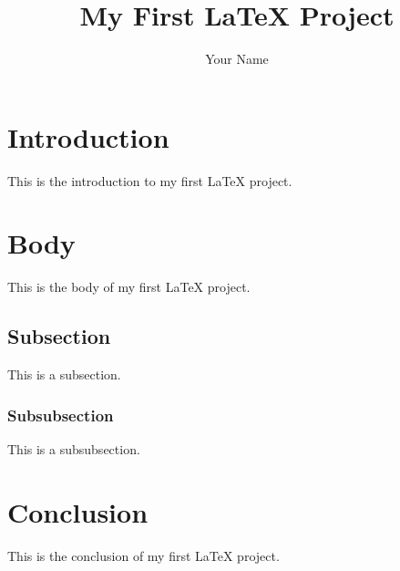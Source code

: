 \documentclass{article}
\begin{document}
\title{My First LaTeX Project}
\author{Your Name}

\maketitle

\section{Introduction}

This is the introduction to my first LaTeX project.

\section{Body}

This is the body of my first LaTeX project.

\subsection{Subsection}

This is a subsection.

\subsubsection{Subsubsection}

This is a subsubsection.

\section{Conclusion}

This is the conclusion of my first LaTeX project.
\end{document}
